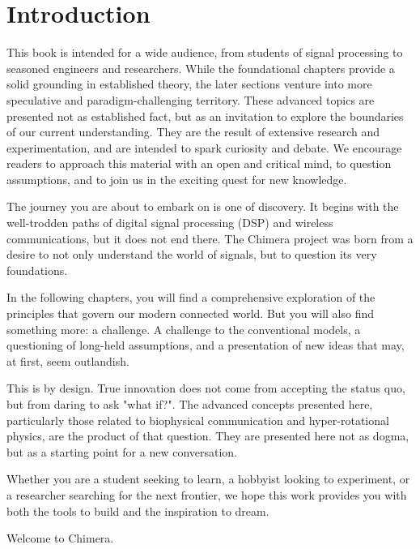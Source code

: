 \chapter*{Introduction}

\begin{nontechnical}
This book is intended for a wide audience, from students of signal processing to seasoned engineers and researchers. While the foundational chapters provide a solid grounding in established theory, the later sections venture into more speculative and paradigm-challenging territory. These advanced topics are presented not as established fact, but as an invitation to explore the boundaries of our current understanding. They are the result of extensive research and experimentation, and are intended to spark curiosity and debate. We encourage readers to approach this material with an open and critical mind, to question assumptions, and to join us in the exciting quest for new knowledge.
\end{nontechnical}

\vspace{1cm}

The journey you are about to embark on is one of discovery. It begins with the well-trodden paths of digital signal processing (DSP) and wireless communications, but it does not end there. The Chimera project was born from a desire to not only understand the world of signals, but to question its very foundations.

In the following chapters, you will find a comprehensive exploration of the principles that govern our modern connected world. But you will also find something more: a challenge. A challenge to the conventional models, a questioning of long-held assumptions, and a presentation of new ideas that may, at first, seem outlandish.

This is by design. True innovation does not come from accepting the status quo, but from daring to ask "what if?". The advanced concepts presented here, particularly those related to biophysical communication and hyper-rotational physics, are the product of that question. They are presented here not as dogma, but as a starting point for a new conversation.

Whether you are a student seeking to learn, a hobbyist looking to experiment, or a researcher searching for the next frontier, we hope this work provides you with both the tools to build and the inspiration to dream.

Welcome to Chimera.
